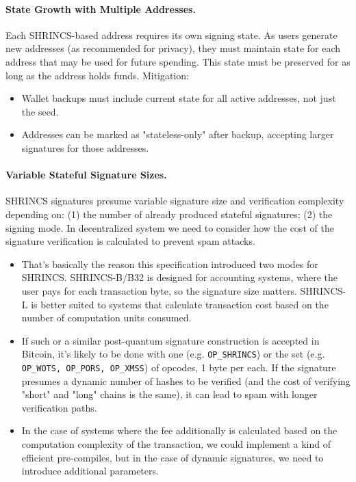 \paragraph{State Growth with Multiple Addresses.}
Each SHRINCS-based address requires its own signing state. As users generate new addresses (as recommended for privacy), they must maintain state for each address that may be used for future spending. This state must be preserved for as long as the address holds funds. Mitigation:
\begin{itemize}
    \item Wallet backups must include current state for all active addresses, not just the seed.
    \item Addresses can be marked as "stateless-only" after backup, accepting larger signatures for those addresses.
\end{itemize}

\paragraph{Variable Stateful Signature Sizes.}
SHRINCS signatures presume variable signature size and verification complexity depending on: (1) the number of already produced stateful signatures; (2) the signing mode. In decentralized system we need to consider how the cost of the signature verification is calculated to prevent spam attacks.
\begin{itemize}
    \item That's basically the reason this specification introduced two modes for SHRINCS. SHRINCS-B/B32 is designed for accounting systems, where the user pays for each transaction byte, so the signature size matters. SHRINCS-L is better suited to systems that calculate transaction cost based on the number of computation units consumed. 
    \item If such or a similar post-quantum signature construction is accepted in Bitcoin, it's likely to be done with one (e.g. \texttt{OP\_SHRINCS}) or the set (e.g. \texttt{OP\_WOTS, OP\_PORS, OP\_XMSS}) of opcodes, 1 byte per each. If the signature presumes a dynamic number of hashes to be verified (and the cost of verifying "short" and "long" chains is the same), it can lead to spam with longer verification paths. 
    \item In the case of systems where the fee additionally is calculated based on the computation complexity of the transaction, we could implement a kind of efficient pre-compiles, but in the case of dynamic signatures, we need to introduce additional parameters. 
\end{itemize}